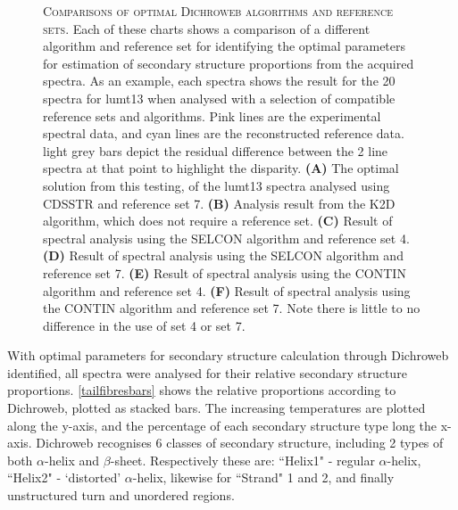 \begin{figure}[p]
	\captionsetup{singlelinecheck=off, justification=justified, font=footnotesize, aboveskip=10pt}
	\caption[Comparisons of Dichroweb algorithms and reference sets]{\textsc{\normalsize Comparisons of optimal Dichroweb algorithms and reference sets.} \vspace{0.1cm} \newline Each of these charts shows a comparison of a different algorithm and reference set for identifying the optimal parameters for estimation of secondary structure proportions from the acquired spectra. As an example, each spectra shows the result for the 20\degC{} spectra for lumt13 when analysed with a selection of compatible reference sets and algorithms. Pink lines are the experimental spectral data, and cyan lines are the reconstructed reference data. light grey bars depict the residual difference between the 2 line spectra at that point to highlight the disparity. \textbf{(A)} The optimal solution from this testing, of the lumt13 spectra analysed using CDSSTR and reference set 7. \textbf{(B)} Analysis result from the K2D algorithm, which does not require a reference set. \textbf{(C)} Result of spectral analysis using the SELCON algorithm and reference set 4. \textbf{(D)} Result of spectral analysis using the SELCON algorithm and reference set 7. \textbf{(E)} Result of spectral analysis using the CONTIN algorithm and reference set 4. \textbf{(F)} Result of spectral analysis using the CONTIN algorithm and reference set 7. Note there is little to no difference in the use of set 4 or set 7.}
	\label{dichrowebalgos}
\end{figure}



With optimal parameters for secondary structure calculation through Dichroweb identified, all spectra were analysed for their relative secondary structure proportions. \vref{tailfibresbars} shows the relative proportions according to Dichroweb, plotted as stacked bars. The increasing temperatures are plotted along the y-axis, and the percentage of each secondary structure type long the x-axis. Dichroweb recognises 6 classes of secondary structure, including 2 types of both $\alpha$-helix and $\beta$-sheet. Respectively these are: ``Helix1" - regular $\alpha$-helix, ``Helix2" - `distorted' $\alpha$-helix, likewise for ``Strand" 1 and 2, and finally unstructured turn and unordered regions. 

